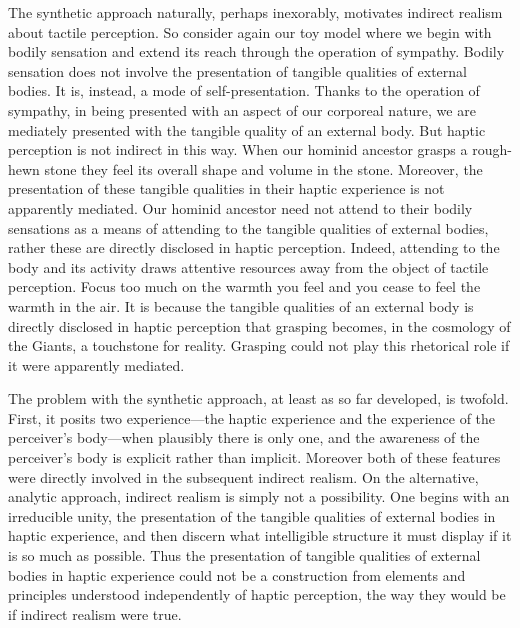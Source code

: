 The synthetic approach naturally, perhaps inexorably, motivates indirect realism about tactile perception. So consider again our toy model where we begin with bodily sensation and extend its reach through the operation of sympathy. Bodily sensation does not involve the presentation of tangible qualities of external bodies. It is, instead, a mode of self-presentation. Thanks to the operation of sympathy, in being presented with an aspect of our corporeal nature, we are mediately presented with the tangible quality of an external body. But haptic perception is not indirect in this way. When our hominid ancestor grasps a rough-hewn stone they feel its overall shape and volume in the stone. Moreover, the presentation of these tangible qualities in their haptic experience is not apparently mediated. Our hominid ancestor need not attend to their bodily sensations as a means of attending to the tangible qualities of external bodies, rather these are directly disclosed in haptic perception. Indeed, attending to the body and its activity draws attentive resources away from the object of tactile perception. Focus too much on the warmth you feel and you cease to feel the warmth in the air. It is because the tangible qualities of an external body is directly disclosed in haptic perception that grasping becomes, in the cosmology of the Giants, a touchstone for reality. Grasping could not play this rhetorical role if it were apparently mediated.

The problem with the synthetic approach, at least as so far developed, is twofold. First, it posits two experience---the haptic experience and the experience of the perceiver's body---when plausibly there is only one, and the awareness of the perceiver's body is explicit rather than implicit. Moreover both of these features were directly involved in the subsequent indirect realism. On the alternative, analytic approach, indirect realism is simply not a possibility. One begins with an irreducible unity, the presentation of the tangible qualities of external bodies in haptic experience, and then discern what intelligible structure it must display if it is so much as possible. Thus the presentation of tangible qualities of external bodies in haptic experience could not be a construction from elements and principles understood independently of haptic perception, the way they would be if indirect realism were true.

